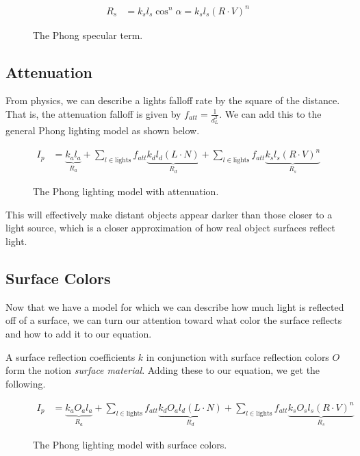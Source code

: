 \documentclass[11pt]{article}
\begin{document}
\begin{figure}[H]
    \begin{align}
        R_s &= k_s l_s \cos^n \alpha = k_s l_s (R \cdot V)^n
    \end{align}
    \caption{The Phong specular term.}
    \label{eqn:phong-specular-term}
\end{figure}

\subsection{Attenuation}
From physics, we can describe a lights falloff rate by the square of the
distance. That is, the attenuation falloff is given by $f_{att} = \frac{1}
{d^2_L}$. We can add this to the general Phong lighting model as shown below.

\begin{figure}[H]
    \begin{align}
        I_p &= \underbrace{k_a l_a}_{R_a}
             + \sum_{l \in \text{lights}}
               f_{att} \underbrace{k_d l_d (L \cdot N)}_{R_d}
             + \sum_{l \in \text{lights}}
               f_{att} \underbrace{k_s l_s (R \cdot V)^n}_{R_s}
    \end{align}
    \caption{The Phong lighting model with attenuation.}
    \label{eqn:phong-attenuation}
\end{figure}

This will effectively make distant objects appear darker than those closer to
a light source, which is a closer approximation of how real object surfaces
reflect light.

\subsection{Surface Colors}
Now that we have a model for which we can describe how much light is reflected
off of a surface, we can turn our attention toward what color the surface
reflects and how to add it to our equation.

A surface reflection coefficients $k$ in conjunction with surface reflection
colors $O$ form the notion {\it surface material}. Adding these to our
equation, we get the following.

\begin{figure}[H]
    \begin{align}
        I_p &= \underbrace{k_a O_a l_a}_{R_a}
             + \sum_{l \in \text{lights}}
               f_{att} \underbrace{k_d O_a l_d (L \cdot N)}_{R_d}
             + \sum_{l \in \text{lights}}
               f_{att} \underbrace{k_s O_s l_s (R \cdot V)^n}_{R_s}
    \end{align}
    \caption{The Phong lighting model with surface colors.}
    \label{eqn:phong-colors}
\end{figure}
\end{document}
